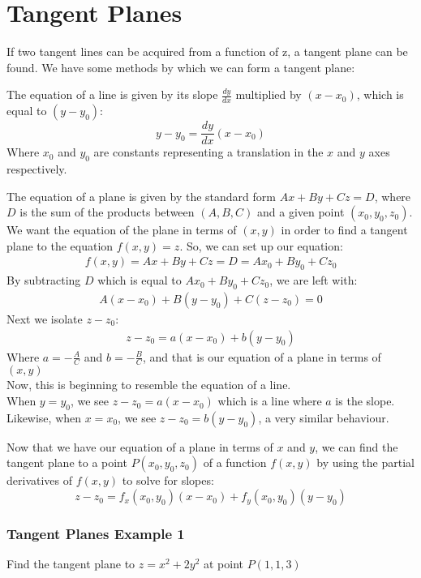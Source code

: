 \documentclass[12pt]{article}
\begin{document}
\section{Tangent Planes}
If two tangent lines can be acquired from a function of z, a tangent plane can be found. We have some methods by which we can form a tangent plane:

\noindent The equation of a line is given by its slope \(\frac{dy}{dx}\) multiplied by \((x-x_0)\), which is equal to \((y-y_0)\):
\[
	y-y_0 = \frac{dy}{dx}(x-x_0)
\]
Where \(x_0\) and \(y_0\) are constants representing a translation in the \(x\) and \(y\) axes respectively.

\noindent The equation of a plane is given by the standard form \(Ax + By + Cz = D\), where \(D\) is the sum of the products between \((A,B,C)\) and a given point \((x_0, y_0, z_0)\).\\
We want the equation of the plane in terms of \((x,y)\) in order to find a tangent plane to the equation \(f(x,y)= z\). So, we can set up our equation:
\begin{align}
	f(x,y) = Ax + By + Cz = D = Ax_0 + By_0 + Cz_0
\end{align}
By subtracting \(D\) which is equal to \(Ax_0 + By_0 + Cz_0\), we are left with:
\begin{align}
	A(x-x_0) + B(y-y_0) + C(z-z_0) = 0
\end{align}
Next we isolate \(z-z_0\):
\begin{align}
	z-z_0=a(x-x_0) + b(y-y_0)  
\end{align}
Where \(a=-\frac{A}{C}\) and \(b = -\frac{B}{C}\), and that is our equation of a plane in terms of \((x,y)\)\\
Now, this is beginning to resemble the equation of a line.\\
When \(y=y_0\), we see \(z-z_0 = a(x-x_0)\) which is a line where \(a\) is the slope.\\
Likewise, when \(x=x_0\), we see \(z-z_0 = b(y-y_0)\), a very similar behaviour.

\noindent Now that we have our equation of a plane in terms of \(x\) and \(y\), we can find the tangent plane to a point \(P(x_0,y_0,z_0)\) of a function \(f(x,y)\) by using the partial derivatives of \(f(x,y)\) to solve for slopes:
\[
	z-z_0 = f_x(x_0,y_0)(x-x_0) + f_y(x_0,y_0)(y-y_0)
\]

\subsubsection{Tangent Planes Example 1}
Find the tangent plane to \(z= x^2 + 2y^2\) at point \(P(1,1,3)\) 
\end{document}
